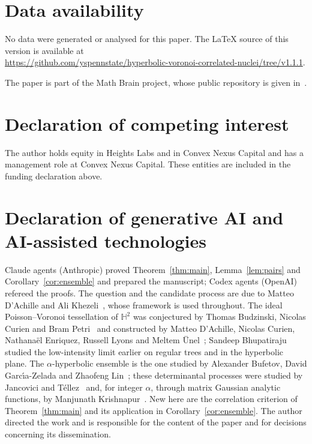 \documentclass[11pt]{amsart}
\theoremstyle{definition}
\theoremstyle{remark}
\newcommand{\HH}{\mathbb{H}}
\begin{document}
\section*{Data availability}
No data were generated or analysed for this paper. The \LaTeX{} source of this version is available at\\
\url{https://github.com/yspennstate/hyperbolic-voronoi-correlated-nuclei/tree/v1.1.1}.

The paper is part of the Math Brain project, whose public repository is given in~\cite{MathBrainRepo}.

\section*{Declaration of competing interest}
The author holds equity in Heights Labs and in Convex Nexus Capital and has a management role at Convex Nexus Capital.
These entities are included in the funding declaration above.

\section*{Declaration of generative AI and AI-assisted technologies}
Claude agents (Anthropic) proved Theorem~\ref{thm:main}, Lemma~\ref{lem:pairs} and Corollary~\ref{cor:ensemble} and
prepared the manuscript; Codex agents (OpenAI) refereed the proofs. The question and the candidate process are due to
Matteo D'Achille and Ali Khezeli~\cite{DK26}, whose framework is used throughout. The ideal Poisson--Voronoi
tessellation of $\HH^2$ was conjectured by Thomas Budzinski, Nicolas Curien and Bram Petri~\cite{BCP25} and constructed
by Matteo D'Achille, Nicolas Curien, Nathana\"el Enriquez, Russell Lyons and Meltem \"Unel~\cite{DCE26}; Sandeep
Bhupatiraju~\cite{Bhu19} studied the low-intensity limit earlier on regular trees and in the hyperbolic plane. The
$\alpha$-hyperbolic ensemble is the one studied by Alexander Bufetov, David Garc\'{\i}a-Zelada and Zhaofeng
Lin~\cite{BGZL23}; these determinantal processes were studied by Jancovici and T\'ellez~\cite{JT98} and, for integer
$\alpha$, through matrix Gaussian analytic functions, by Manjunath Krishnapur~\cite{Kri09}. New here are the correlation
criterion of Theorem~\ref{thm:main} and its application in Corollary~\ref{cor:ensemble}. The author directed the work
and is responsible for the content of the paper and for decisions concerning its dissemination.
\end{document}
